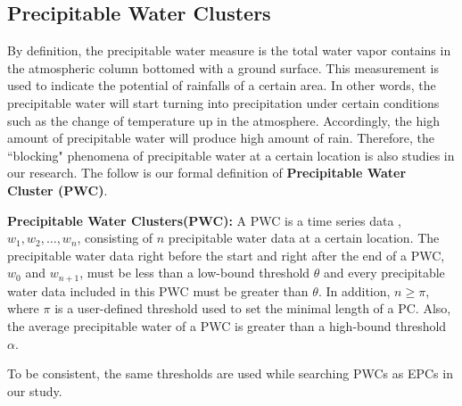 \documentclass{acm_proc_article-sp}
\begin{document}
\subsection{Precipitable Water Clusters}
\label{sec:PWC}
By definition, the precipitable water measure is the total water vapor contains in the atmospheric column bottomed with a ground surface. This measurement is used to indicate the potential of rainfalls of a certain area. In other words, the precipitable water will start turning into precipitation under certain conditions such as the change of temperature up in the atmosphere. \cite{king2003cloud} Accordingly, the high amount of precipitable water will produce high amount of rain. 
\newline Therefore, the ``blocking" phenomena of precipitable water at a certain location is also studies in our research. The follow is our formal definition of \textbf{Precipitable Water Cluster (PWC)}. 
\begin{mydef} 
\label{def:PWC}
\textbf{Precipitable Water Clusters(PWC):} A PWC is a time series data , $w_1 , w_2 ,
\ldots , w_n $, consisting of $n$ precipitable water data at a certain location. The
precipitable water data right before the start and right after the end of a PWC, $w_0$
and $w_{n+1}$, must be less than a low-bound threshold $\theta$ and every
precipitable water data included in this PWC must be greater than $\theta$. In
addition, $n \geq \pi $, where $\pi $ is a user-defined threshold used to set
the minimal length of a PC. Also, the average precipitable water of a PWC is greater than a high-bound threshold $\alpha$.
\end{mydef} 
To be consistent, the same thresholds are used while searching PWCs as EPCs in our study.
\end{document}
